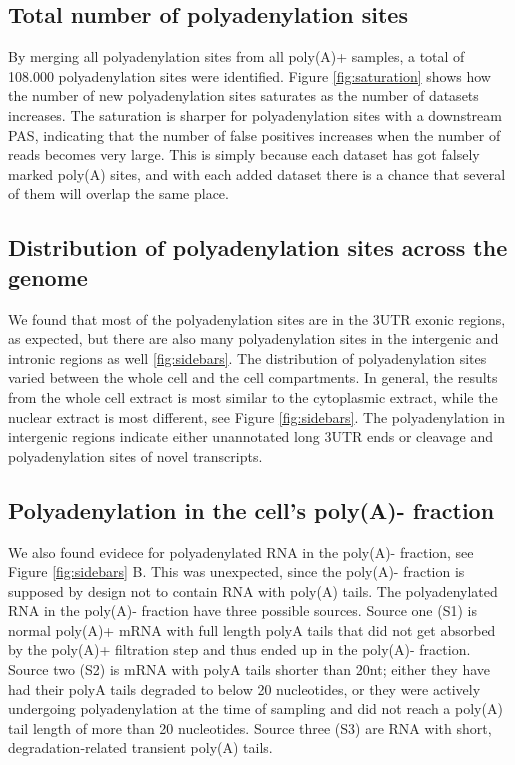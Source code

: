 \subsection{Total number of polyadenylation sites}
By merging all polyadenylation sites from all poly(A)+ samples, a total of
108.000 polyadenylation sites were identified. Figure \ref{fig:saturation}
shows how the number of new polyadenylation sites saturates as the number of
datasets increases. The saturation is sharper for polyadenylation sites with a
downstream PAS, indicating that the number of false positives increases when
the number of reads becomes very large. This is simply because each dataset
has got falsely marked poly(A) sites, and with each added dataset there is a
chance that several of them will overlap the same place.

\subsection{Distribution of polyadenylation sites across the genome}
We found that most of the polyadenylation sites are in the 3\p UTR exonic
regions, as expected, but there are also many polyadenylation sites in the
intergenic and intronic regions as well \ref{fig:sidebars}. The distribution of
polyadenylation sites varied between the whole cell and the cell compartments.
In general, the results from the whole cell extract is most similar to the
cytoplasmic extract, while the nuclear extract is most different, 
see Figure \ref{fig:sidebars}. The polyadenylation in intergenic regions
indicate either unannotated long 3\p UTR ends or cleavage and polyadenylation
sites of novel transcripts.

\subsection{Polyadenylation in the cell's poly(A)- fraction}
We also found evidece for polyadenylated RNA in the poly(A)- fraction, see
Figure \ref{fig:sidebars} B. This was unexpected, since the poly(A)- fraction
is supposed by design not to contain RNA with poly(A) tails. The polyadenylated
RNA in the poly(A)- fraction have three possible sources. Source one (S1) is
normal poly(A)+ mRNA with full length polyA tails that did not get absorbed by
the poly(A)+ filtration step and thus ended up in the poly(A)- fraction. Source
two (S2) is mRNA with polyA tails shorter than 20nt; either they have had
their polyA tails degraded to below 20 nucleotides, or they were actively
undergoing polyadenylation at the time of sampling and did not reach a poly(A)
tail length of more than 20 nucleotides. Source three (S3) are RNA with short,
degradation-related transient poly(A) tails. 

